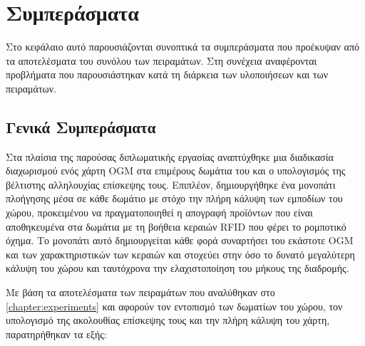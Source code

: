 \chapter{Συμπεράσματα}
\label{chapter:conclusions}

Στο κεφάλαιο αυτό παρουσιάζονται συνοπτικά τα συμπεράσματα που προέκυψαν από τα αποτελέσματα του συνόλου των πειραμάτων. Στη συνέχεια αναφέρονται προβλήματα που παρουσιάστηκαν κατά τη διάρκεια των υλοποιήσεων και των πειραμάτων.


\section{Γενικά Συμπεράσματα}

Στα πλαίσια της παρούσας διπλωματικής εργασίας αναπτύχθηκε μια διαδικασία διαχωρισμού ενός χάρτη OGM στα επιμέρους δωμάτια του και ο υπολογισμός της βέλτιστης αλληλουχίας επίσκεψης τους. Επιπλέον, δημιουργήθηκε ένα μονοπάτι πλοήγησης μέσα σε κάθε δωμάτιο με στόχο την πλήρη κάλυψη των εμποδίων του χώρου, προκειμένου να πραγματοποιηθεί η απογραφή προϊόντων που είναι αποθηκευμένα στα δωμάτια με τη βοήθεια κεραιών RFID που φέρει το ρομποτικό όχημα. Το μονοπάτι αυτό δημιουργείται κάθε φορά συναρτήσει του εκάστοτε OGM και των χαρακτηριστικών των κεραιών και στοχεύει στην όσο το δυνατό μεγαλύτερη κάλυψη του χώρου και ταυτόχρονα την ελαχιστοποίηση του μήκους της διαδρομής.

Με βάση τα αποτελέσματα των πειραμάτων που αναλύθηκαν στο \autoref{chapter:experiments} και αφορούν τον εντοπισμό των δωματίων του χώρου, τον υπολογισμό της ακολουθίας επίσκεψης τους και την πλήρη κάλυψη του χάρτη, παρατηρήθηκαν τα εξής:


